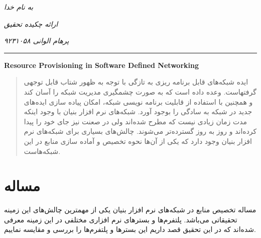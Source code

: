 ﻿\documentclass[11pt]{article}
\begin{document}
\begin{titlepage}
	\centering
	\emph{به نام خدا}\par
	\vspace{.5cm}
	\emph{ارائه چکیده تحقیق}\par
	\vspace{.5cm}
	\emph{پرهام الوانی ۹۲۳۱۰۵۸}\par
	\vspace{.25cm}
	\rule{\textwidth}{1pt}
	\vspace{.25cm}
	\begin{latin}
		{\huge\bfseries Resource Provisioning in Software Defined Networking}\par
	\end{latin}
\end{titlepage}
\begin{abstract}
	ایده شبکه‌های قابل برنامه ریزی به تازگی با توجه به ظهور  شتاب قابل توجهی گرفتهاست.
	 وعده داده است که به صورت چشمگیری مدیریت شبکه را آسان کند و همچنین با استفاده از قابلیت برنامه نویسی شبکه، امکان پیاده سازی ایده‌های جدید در شبکه به سادگی را بوجود آورد.
شبکه‌های نرم افزار بنیان با وجود اینکه مدت زمان زیادی نیست که مطرح شده‌اند ولی در صعنت نیز جای خود را پیدا کرده‌اند و روز به روز گسترده‌تر می‌شوند. چالش‌های بسیاری برای شبکه‌های نرم افزار بنیان وجود دارد که یکی از آن‌ها نحوه تخصیص و آماده سازی منابع در این شبکه‌هاست.
\end{abstract}
\section*{مساله}
	مساله تخصیص منابع در شبکه‌های نرم افزار بنیان یکی از مهمترین چالش‌های این زمینه تحقیقاتی می‌باشد. پلتفرم‌ها و بستر‌های نرم افزاری مختلفی در این زمینه معرفی شده‌اند که در این تحقیق قصد داریم این بستر‌ها و پلتفرم‌ها را بررسی و مقایسه نماییم.
\end{document}
